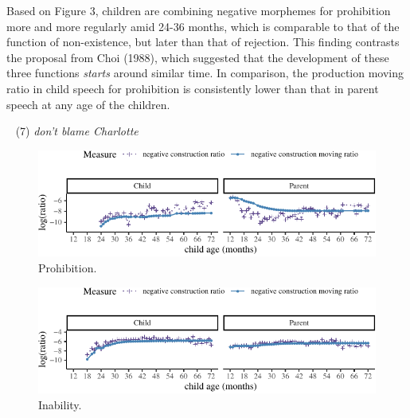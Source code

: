 \documentclass[10pt, letterpaper]{article}
\newenvironment{CodeChunk}{}{}
\begin{document}
Based on Figure 3, children are combining negative morphemes for
prohibition more and more regularly amid 24-36 months, which is
comparable to that of the function of non-existence, but later than that
of rejection. This finding contrasts the proposal from Choi (1988),
which suggested that the development of these three functions
\emph{starts} around similar time. In comparison, the production moving
ratio in child speech for prohibition is consistently lower than that in
parent speech at any age of the children.

~ (7) \emph{don't blame Charlotte}

\begin{figure}[h]

\begin{CodeChunk}


\begin{center}\includegraphics{figs/prohibition-1} \end{center}

\end{CodeChunk}
\caption[This image spans both columns]{Prohibition.}\label{fig:prohibition}
\end{figure}

\begin{figure}[h]

\begin{CodeChunk}


\begin{center}\includegraphics{figs/inability-1} \end{center}

\end{CodeChunk}
\caption[This image spans both columns]{Inability.}\label{fig:inability}
\end{figure}
\end{document}
